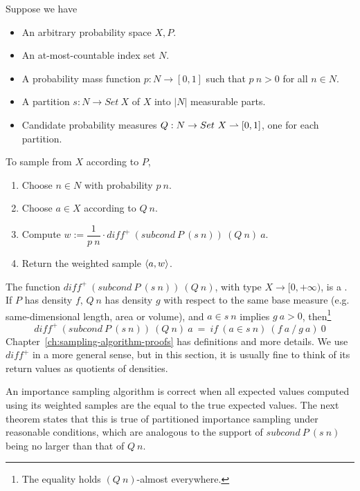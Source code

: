 \begin{definition}
\label{def:partitioned-importance-sampling}
Suppose we have
\begin{itemize}
	\item An arbitrary probability space $X,P$.
	\item An at-most-countable index set $N$.
	\item A probability mass function $p : N \to [0,1]$ such that $p~n > 0$ for all $n \in N$.
	\item A partition $s : N \to Set~X$ of $X$ into $|N|$ measurable parts.
	\item Candidate probability measures $Q : N \to Set~X \rightharpoonup [0,1]$, one for each partition.
\end{itemize}
To sample from $X$ according to $P$,
\begin{enumerate}
	\item Choose $n \in N$ with probability $p~n$.
	\item Choose $a \in X$ according to $Q~n$.
	\item Compute $w := \dfrac{1}{p~n} \cdot diff^+~(subcond~P~(s~n))~(Q~n)~a$.
	\item Return the weighted sample $\langle{a,w}\rangle$.
\end{enumerate}
\end{definition}

The function $diff^+~(subcond~P~(s~n))~(Q~n)$, with type $X \to [0,+\infty)$, is a .
If $P$ has density $f$, $Q~n$ has density $g$ with respect to the same base measure (e.g. same-dimensional length, area or volume), and $a \in s~n$ implies $g~a > 0$, then\footnote{The equality holds $(Q~n)$-almost everywhere.}
\begin{equation}
	diff^+~(subcond~P~(s~n))~(Q~n)~a\ =\ if~(a \in s~n)~(f~a~{/}~g~a)~0
\end{equation}
Chapter~\ref{ch:sampling-algorithm-proofs} has definitions and more details.
We use $diff^+$ in a more general sense, but in this section, it is usually fine to think of its return values as quotients of densities.

An importance sampling algorithm is correct when all expected values computed using its weighted samples are the equal to the true expected values.
The next theorem states that this is true of partitioned importance sampling under reasonable conditions, which are analogous to the support of $subcond~P~(s~n)$ being no larger than that of $Q~n$.

